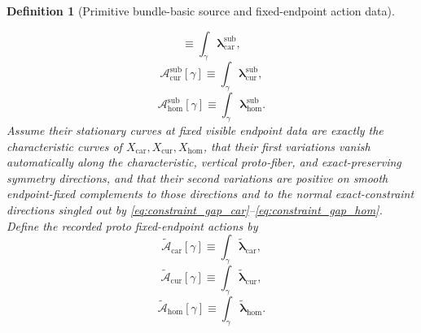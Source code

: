 \documentclass[11pt]{article}
\newcommand{\TensorFlowField}{X_{\mathrm{car}}}
\newcommand{\CurFlowField}{X_{\mathrm{cur}}}
\newcommand{\HomFlowField}{X_{\mathrm{hom}}}
\newcommand{\TensorProtoRateForm}{\widetilde{\boldsymbol{\lambda}}_{\mathrm{car}}}
\newcommand{\CurProtoRateForm}{\widetilde{\boldsymbol{\lambda}}_{\mathrm{cur}}}
\newcommand{\HomProtoRateForm}{\widetilde{\boldsymbol{\lambda}}_{\mathrm{hom}}}
\newcommand{\TensorProtoAction}{\widetilde{\mathscr A}_{\mathrm{car}}}
\newcommand{\CurProtoAction}{\widetilde{\mathscr A}_{\mathrm{cur}}}
\newcommand{\HomProtoAction}{\widetilde{\mathscr A}_{\mathrm{hom}}}
\newcommand{\TensorSeedRateForm}{\boldsymbol{\lambda}_{\mathrm{car}}^{\mathrm{sub}}}
\newcommand{\CurSeedRateForm}{\boldsymbol{\lambda}_{\mathrm{cur}}^{\mathrm{sub}}}
\newcommand{\HomSeedRateForm}{\boldsymbol{\lambda}_{\mathrm{hom}}^{\mathrm{sub}}}
\newcommand{\CurSeedAction}{\mathscr A_{\mathrm{cur}}^{\mathrm{sub}}}
\newcommand{\HomSeedAction}{\mathscr A_{\mathrm{hom}}^{\mathrm{sub}}}
\newtheorem{definition}{Definition}
\begin{document}
\begin{definition}[Primitive bundle-basic source and fixed-endpoint action data]
\begin{enumerate}
\begin{equation}
    \equiv
    \int_\gamma \TensorSeedRateForm,
    \label{eq:seed_action_car}
    \end{equation}
    \begin{equation}
    \CurSeedAction[\gamma]
    \equiv
    \int_\gamma \CurSeedRateForm,
    \label{eq:seed_action_cur}
    \end{equation}
    \begin{equation}
    \HomSeedAction[\gamma]
    \equiv
    \int_\gamma \HomSeedRateForm.
    \label{eq:seed_action_hom}
    \end{equation}
    Assume their stationary curves at fixed visible endpoint data are exactly the characteristic curves of \(\TensorFlowField,\CurFlowField,\HomFlowField\), that their first variations vanish automatically along the characteristic, vertical proto-fiber, and exact-preserving symmetry directions, and that their second variations are positive on smooth endpoint-fixed complements to those directions and to the normal exact-constraint directions singled out by \eqref{eq:constraint_gap_car}--\eqref{eq:constraint_gap_hom}. Define the recorded proto fixed-endpoint actions by
    \begin{equation}
    \TensorProtoAction[\gamma]
    \equiv
    \int_\gamma \TensorProtoRateForm,
    \label{eq:proto_action_from_seed_car}
    \end{equation}
    \begin{equation}
    \CurProtoAction[\gamma]
    \equiv
    \int_\gamma \CurProtoRateForm,
    \label{eq:proto_action_from_seed_cur}
    \end{equation}
    \begin{equation}
    \HomProtoAction[\gamma]
    \equiv
    \int_\gamma \HomProtoRateForm.
    \label{eq:proto_action_from_seed_hom}
    \end{equation}
\end{enumerate}
\end{definition}
\end{document}
